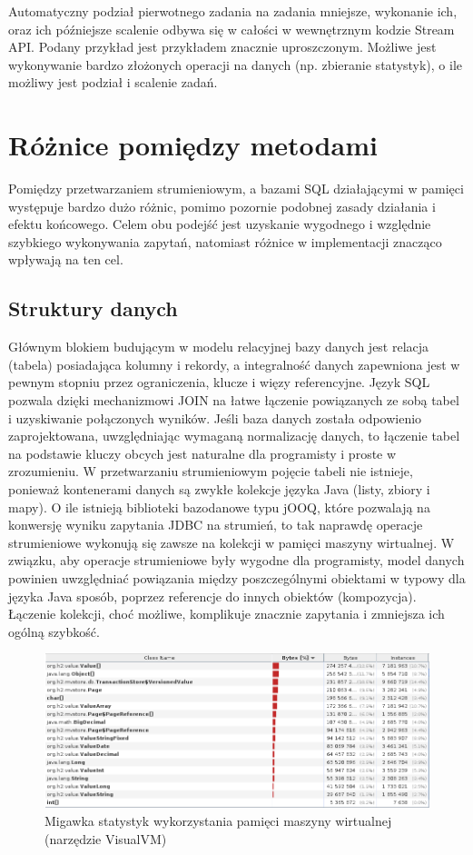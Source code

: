 \documentclass[12pt]{extarticle}
\begin{document}
    Automatyczny podział pierwotnego zadania na zadania mniejsze, wykonanie ich, oraz ich późniejsze scalenie odbywa się w całości w wewnętrznym kodzie Stream API. Podany przykład jest przykładem znacznie uproszczonym. Możliwe jest wykonywanie bardzo złożonych operacji na danych (np. zbieranie statystyk), o ile możliwy jest podział i scalenie zadań.

\section{Różnice pomiędzy metodami}

    Pomiędzy przetwarzaniem strumieniowym, a bazami SQL działającymi w pamięci występuje bardzo dużo różnic, pomimo pozornie podobnej zasady działania i efektu końcowego. Celem obu podejść jest uzyskanie wygodnego i względnie szybkiego wykonywania zapytań, natomiast różnice w implementacji znacząco wpływają na ten cel.

\subsection{Struktury danych}

    Głównym blokiem budującym w modelu relacyjnej bazy danych jest relacja (tabela) posiadająca kolumny i rekordy, a integralność danych zapewniona jest w pewnym stopniu przez ograniczenia, klucze i więzy referencyjne. Język SQL pozwala dzięki mechanizmowi JOIN na łatwe łączenie powiązanych ze sobą tabel i uzyskiwanie połączonych wyników. Jeśli baza danych została odpowienio zaprojektowana, uwzględniając wymaganą normalizację danych, to łączenie tabel na podstawie kluczy obcych jest naturalne dla programisty i proste w zrozumieniu. W przetwarzaniu strumieniowym pojęcie tabeli nie istnieje, ponieważ kontenerami danych są zwykłe kolekcje języka Java (listy, zbiory i mapy). O ile istnieją biblioteki bazodanowe typu jOOQ, które pozwalają na konwersję wyniku zapytania JDBC na strumień, to tak naprawdę operacje strumieniowe wykonują się zawsze na kolekcji w pamięci maszyny wirtualnej. W związku, aby operacje strumieniowe były wygodne dla programisty, model danych powinien uwzględniać powiązania między poszczególnymi obiektami w typowy dla języka Java sposób, poprzez referencje do innych obiektów (kompozycja). Łączenie kolekcji, choć możliwe, komplikuje znacznie zapytania i zmniejsza ich ogólną szybkość.

\begin{figure}[H]
\centering
\includegraphics[width=12cm]{jvmmemory}
\caption{Migawka statystyk wykorzystania pamięci maszyny wirtualnej (narzędzie VisualVM)}
\label{fig:jvmmemory}
\end{figure}
\end{document}
